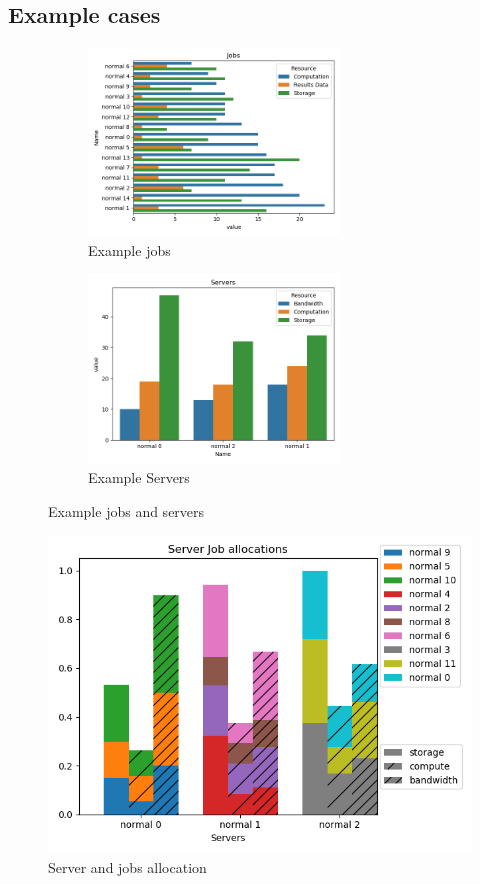 \documentclass[fleqn]{article}
\begin{document}
\subsection{Example cases}\label{subsec:example-cases}
\begin{figure}[H]
    \begin{subfigure}{0.5\textwidth}
        \includegraphics[width=1\linewidth, height=5cm]{../results/jobs.png}
        \caption{Example jobs}
    \end{subfigure}
    \begin{subfigure}{0.5\textwidth}
        \includegraphics[width=1\linewidth, height=5cm]{../results/servers.png}
        \caption{Example Servers}
    \end{subfigure}

    \caption{Example jobs and servers}
\end{figure}

\begin{figure}[H]
    \centering
    \includegraphics[width=1\textwidth]{../results/greedy_allocation.png}
    \caption{Server and jobs allocation}
\end{figure}
\end{document}
